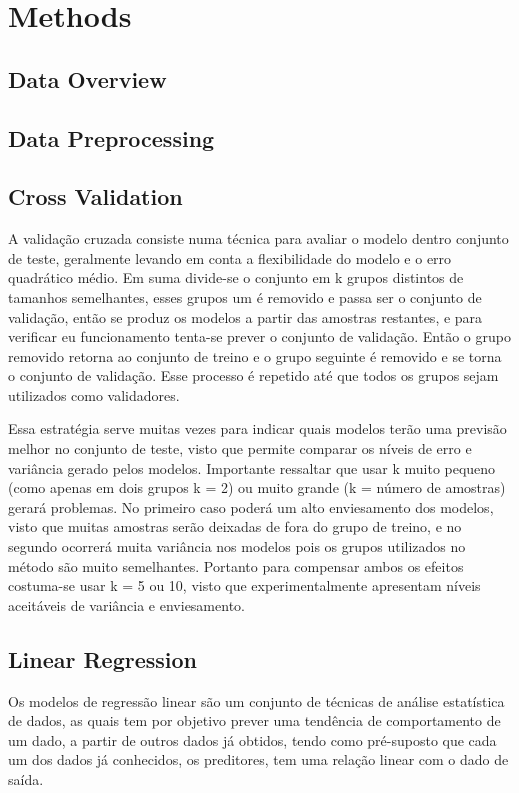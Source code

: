 \section{Methods}

\subsection{Data Overview}

\subsection{Data Preprocessing}

\subsection{Cross Validation}
A validação cruzada consiste numa técnica para avaliar o modelo dentro conjunto de teste, geralmente levando em conta a flexibilidade do modelo e o erro quadrático médio. Em suma divide-se o conjunto em k grupos distintos de tamanhos semelhantes, esses grupos um é removido e passa ser o conjunto de validação, então se produz os modelos a partir das amostras restantes, e para verificar  eu funcionamento tenta-se prever o conjunto de validação. Então o grupo removido retorna ao conjunto de treino e o grupo seguinte é removido e se torna o conjunto de validação. Esse processo é repetido até que todos os grupos sejam utilizados como validadores.

Essa estratégia serve muitas vezes para indicar quais modelos terão uma previsão melhor no conjunto de teste, visto que permite comparar os níveis de erro e variância gerado pelos modelos. Importante ressaltar que usar k muito pequeno (como apenas em dois grupos k = 2) ou muito grande (k = número de amostras) gerará problemas. No primeiro caso poderá um alto enviesamento dos modelos, visto que muitas amostras serão deixadas de fora do grupo de treino, e no segundo ocorrerá muita variância nos modelos pois os grupos utilizados no método são muito semelhantes. Portanto para compensar ambos os efeitos costuma-se usar k = 5 ou 10, visto que experimentalmente apresentam níveis aceitáveis de variância e enviesamento.

\subsection{Linear Regression}
Os modelos de regressão linear são um conjunto de técnicas de análise estatística de dados, as quais tem por objetivo prever uma tendência de comportamento de um dado, a partir de outros dados já obtidos, tendo como pré-suposto que cada um dos dados já conhecidos, os preditores, tem uma relação linear com o dado de saída.

